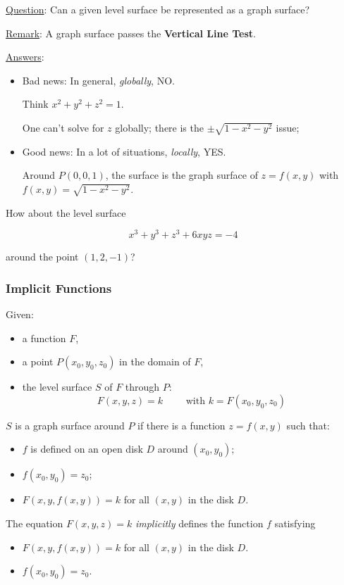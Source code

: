 \begin{frame}

\underline{Question}: Can a given level surface be represented as a graph surface?

\pause
\medskip

\underline{Remark}: A graph surface passes the \textbf{Vertical Line Test}.

\pause
\medskip
\underline{Answers}:
\begin{itemize}
  \item \pause Bad news: In general, \emph{globally}, NO.

  \noindent Think $x^2+y^2+z^2= 1$.

  One can't solve for $z$ globally; there is the $\pm\sqrt{1-x^2-y^2}$ issue;
  \item \pause Good news: In a lot of situations, \emph{locally}, YES.

  \noindent Around $P(0,0,1)$, the surface is the graph surface of $z = f(x,y)$ with $f(x,y) =\sqrt{1-x^2-y^2}$.
\end{itemize}

\pause
How about the level surface

$$x^3+y^3+z^3+6xyz =-4$$

around the point $(1,2,-1)$?
\end{frame}

\begin{frame}
\frametitle{Implicit Functions}

Given:
\begin{itemize}
  \item a function $F$,
  \item a point $P(x_0,y_0,z_0)$ in the domain of $F$,
  \item the level surface $S$ of $F$ through $P$:
  $$F(x,y,z) = k \qquad \text{ with } k=F(x_0,y_0,z_0)$$
\end{itemize}

\pause
$S$ is a graph surface around $P$ if there is a function $z=f(x,y)$ such that:
%
\begin{itemize}
  \item $f$ is defined on an open disk $D$ around $(x_0,y_0)$;
  \item $f(x_0,y_0) = z_0$;
  \item $F(x,y,f(x,y)) = k$ for all $(x,y)$ in the disk $D$.
\end{itemize}

\pause
The equation $F(x,y,z) = k$ \emph{implicitly} defines the function $f$ satisfying
%
\begin{itemize}
  \item $F(x,y,f(x,y)) = k$ for all $(x,y)$ in the disk $D$.
  \item $f(x_0,y_0) = z_0$.
\end{itemize}
\end{frame}

